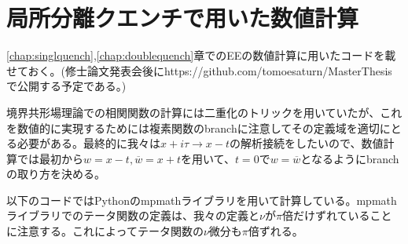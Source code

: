 \chapter{局所分離クエンチで用いた数値計算}
\ref{chap:singlquench},\ref{chap:doublequench}章でのEEの数値計算に用いたコードを載せておく。(修士論文発表会後にhttps://github.com/tomoesaturn/MasterThesis で公開する予定である。)

境界共形場理論での相関関数の計算には二重化のトリックを用いていたが、これを数値的に実現するためには複素関数のbranchに注意してその定義域を適切にとる必要がある。最終的に我々は$x+i\tau\to x-t$の解析接続をしたいので、数値計算では最初から$w=x-t,\overline{w}=x+t$を用いて、$t=0$で$w=\overline{w}$となるようにbranchの取り方を決める。

以下のコードではPythonのmpmathライブラリを用いて計算している。mpmathライブラリでのテータ関数の定義は、我々の定義と$\nu$が$\pi$倍だけずれていることに注意する。これによってテータ関数の$\nu$微分も$\pi$倍ずれる。

